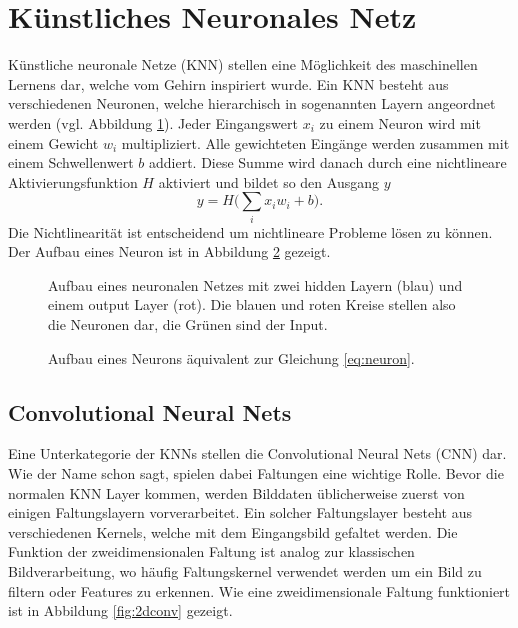 \section{Künstliches Neuronales Netz}

Künstliche neuronale Netze (KNN) stellen eine Möglichkeit des maschinellen Lernens dar, welche vom Gehirn inspiriert wurde.
%
%
Ein KNN besteht aus verschiedenen Neuronen, welche hierarchisch in sogenannten Layern angeordnet werden (vgl. Abbildung \ref{fig:neuralnet}).
Jeder Eingangswert $x_i$ zu einem Neuron wird mit einem Gewicht $w_i$ multipliziert.
%
Alle gewichteten Eingänge werden zusammen mit einem Schwellenwert $b$ addiert.
%
Diese Summe wird danach durch eine nichtlineare Aktivierungsfunktion $H$ aktiviert und bildet so den Ausgang $y$
%
\begin{equation} \label{eq:neuron}
y=H\biggl(\sum_{i} x_i w_i+b\biggr).
\end{equation}
Die Nichtlinearität ist entscheidend um nichtlineare Probleme lösen zu können.
Der Aufbau eines Neuron ist in Abbildung \ref{fig:neuron} gezeigt. 

\begin{figure}
	\centering
	
	\caption{Aufbau eines neuronalen Netzes mit zwei hidden Layern (blau) und einem output Layer (rot). Die blauen und roten Kreise stellen also die Neuronen dar, die Grünen sind der Input.}
	\label{fig:neuralnet}
\end{figure}

\begin{figure}
	\centering
	
	\caption{Aufbau eines Neurons äquivalent zur Gleichung \ref{eq:neuron}.}
	\label{fig:neuron}
\end{figure}

\subsection{Convolutional Neural Nets}

Eine Unterkategorie der KNNs stellen die Convolutional Neural Nets (CNN) dar.
%
Wie der Name schon sagt, spielen dabei Faltungen eine wichtige Rolle.
Bevor die normalen KNN Layer kommen, werden Bilddaten üblicherweise zuerst von einigen Faltungslayern vorverarbeitet.
Ein solcher Faltungslayer besteht aus verschiedenen Kernels, welche mit dem Eingangsbild gefaltet werden.
Die Funktion der zweidimensionalen Faltung ist analog zur klassischen Bildverarbeitung, wo häufig Faltungskernel verwendet werden um ein Bild zu filtern oder Features zu erkennen.
%
Wie eine zweidimensionale Faltung funktioniert ist in Abbildung \ref{fig:2dconv} gezeigt.

